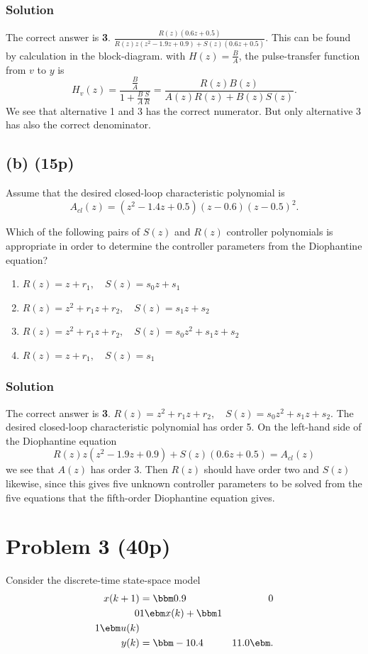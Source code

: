 \documentclass{scrartcl}
\begin{document}
\subsubsection*{Solution}
\label{sec-2-1-1}
The correct answer is \textbf{3}. \(\frac{R(z) \left(0.6 z + 0.5\right)}{R(z) z \left(z^{2} - 1.9 z + 0.9\right) + S(z) \left(0.6 z + 0.5\right)}\). This can be found by calculation in the block-diagram. with $H(z) = \frac{B}{A}$, the pulse-transfer function from $v$ to $y$ is
\[ H_v(z) = \frac{\frac{B}{A}}{1 + \frac{B}{A}\frac{S}{R}} = \frac{R(z)B(z)}{A(z)R(z) + B(z)S(z)}. \]
We see that alternative 1 and 3 has the correct numerator. But only alternative 3 has also the correct denominator.

\subsection*{(b) (15p)}
\label{sec-2-2}
Assume that the desired closed-loop characteristic polynomial is
\[ A_{cl}(z) = (z^2 - 1.4z + 0.5)(z-0.6)(z-0.5)^2. \]

Which of the following pairs of $S(z)$ and $R(z)$ controller polynomials is appropriate in order to determine the controller parameters from the Diophantine equation?
\begin{enumerate}
\item \(R(z) = z + r_1, \quad S(z) = s_0z + s_1 \)
\item \(R(z) = z^2 + r_1z + r_2, \quad S(z) = s_1z + s_2 \)
\item \(R(z) = z^2 + r_1z + r_2, \quad S(z) = s_0z^2 + s_1z + s_2 \)
\item \(R(z) = z + r_1, \quad S(z) = s_1 \)
\end{enumerate}

\subsubsection*{Solution}
\label{sec-2-2-1}
The correct answer is \textbf{3}.  \(R(z) = z^2 + r_1z + r_2, \quad S(z) = s_0z^2 + s_1z + s_2 \). The desired closed-loop characteristic polynomial has order 5. On the left-hand side of the Diophantine equation 
\[ R(z) z \left(z^{2} - 1.9 z + 0.9\right) + S(z) \left(0.6 z + 0.5\right) = A_{cl}(z) \]
we see that $A(z)$ has order 3. Then $R(z)$ should have order two and $S(z)$ likewise, since this gives five unknown controller parameters to be solved from the five equations that the fifth-order Diophantine equation gives. 

\section*{Problem 3 (40p)}
\label{sec-3}
Consider the discrete-time state-space model
 \begin{equation*}
 \begin{split}
  x(k+1) &= \bbm 0.9 & 0\\0 & 1\ebm x(k) + \bbm 1\\1 \ebm u(k)\\
  y(k) &= \bbm -10.4 & 11.0 \ebm.
 \end{split}
\end{equation*}
\end{document}
